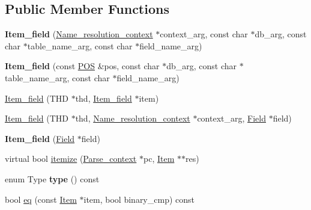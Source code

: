 \subsection*{Public Member Functions}
\begin{DoxyCompactItemize}
\item 
\mbox{\label{classItem__field_ad1e24ce612dba5ad92435f0f44ff2fd9}} 
{\bfseries Item\+\_\+field} (\mbox{\hyperlink{structName__resolution__context}{Name\+\_\+resolution\+\_\+context}} $\ast$context\+\_\+arg, const char $\ast$db\+\_\+arg, const char $\ast$table\+\_\+name\+\_\+arg, const char $\ast$field\+\_\+name\+\_\+arg)
\item 
\mbox{\label{classItem__field_afb1c90bdebb44d47550e267730ff14c1}} 
{\bfseries Item\+\_\+field} (const \mbox{\hyperlink{structYYLTYPE}{P\+OS}} \&pos, const char $\ast$db\+\_\+arg, const char $\ast$table\+\_\+name\+\_\+arg, const char $\ast$field\+\_\+name\+\_\+arg)
\item 
\mbox{\hyperlink{classItem__field_a7ba647131cd5b596fe202de4cf31e64f}{Item\+\_\+field}} (T\+HD $\ast$thd, \mbox{\hyperlink{classItem__field}{Item\+\_\+field}} $\ast$item)
\item 
\mbox{\hyperlink{classItem__field_ada754f3ad660c242d38db725bf33a7de}{Item\+\_\+field}} (T\+HD $\ast$thd, \mbox{\hyperlink{structName__resolution__context}{Name\+\_\+resolution\+\_\+context}} $\ast$context\+\_\+arg, \mbox{\hyperlink{classField}{Field}} $\ast$field)
\item 
\mbox{\label{classItem__field_a75b3a0617e43bb972cbd73c8cfbb5168}} 
{\bfseries Item\+\_\+field} (\mbox{\hyperlink{classField}{Field}} $\ast$field)
\item 
virtual bool \mbox{\hyperlink{classItem__field_a6220537b7094a20e4dfb15e229e1a33c}{itemize}} (\mbox{\hyperlink{structParse__context}{Parse\+\_\+context}} $\ast$pc, \mbox{\hyperlink{classItem}{Item}} $\ast$$\ast$res)
\item 
\mbox{\label{classItem__field_a3108cbac578f16963518f1982fc9811e}} 
enum Type {\bfseries type} () const
\item 
bool \mbox{\hyperlink{classItem__field_a009fb19dc742f706ec5c8bad9a6a0c2d}{eq}} (const \mbox{\hyperlink{classItem}{Item}} $\ast$item, bool binary\+\_\+cmp) const
\item 
\mbox{\label{classItem__field_a6cc52321a568cf1f15036f090b306e4a}} 
$$
\end{DoxyCompactItemize}
